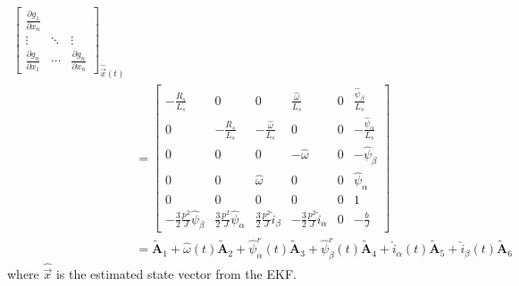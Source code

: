 \documentclass[12pt,a4paper,oneside]{book}
\begin{document}
\begin{onehalfspace}
\begin{mybox}
\begin{equation}
\begin{aligned}
\begin{bmatrix}
				\frac{\partial g_1}{\partial x_n} \\[6pt]
				\vdots & \ddots & \vdots \\[6pt]
				\frac{\partial g_n}{\partial x_1} & \cdots & \frac{\partial 
					g_n}{\partial x_n}
			\end{bmatrix}_{\hat{\vec{x}}(t)} \\[8pt]
			&= \begin{bmatrix} 
				-\frac{R_s}{L_s} & 0 & 0 & \frac{\hat{\omega}}{L_s} & 0 & \frac{\hat{\psi}_\beta}{L_s} \\[6pt]			
				0 & -\frac{R_s}{L_s} & -\frac{\hat{\omega}}{L_s} & 0 & 0 & -\frac{\hat{\psi}_\alpha}{L_s} \\[6pt]
				0 & 0 & 0 & -\hat{\omega} & 0 & -\hat{\psi}_\beta \\[6pt]
				0 & 0 & \hat{\omega} & 0 & 0 & \hat{\psi}_\alpha \\[6pt]
				0 & 0 & 0 & 0 & 0 & 1 \\[6pt]
				-\frac{3}{2}\frac{p^2}{J}\hat{\psi}_\beta & \frac{3}{2}\frac{p^2}{J}\hat{\psi}_\alpha
				& \frac{3}{2}\frac{p^2}{J}\hat{i}_\beta & -\frac{3}{2}\frac{p^2}{J}\hat{i}_\alpha & 0 & -\frac{b}{J}
			\end{bmatrix}  \\[8pt]
			&=\tilde{\mathbf{A}}_1 + 
			\hat{\omega}(t) \tilde{\mathbf{A}}_2 + \hat{\psi}_\alpha^r(t) 
			\tilde{\mathbf{A}}_3 + \hat{\psi}_\beta^r(t) \tilde{\mathbf{A}}_4
			+ \hat{i}_\alpha(t) 
			\tilde{\mathbf{A}}_5 + \hat{i}_\beta(t) \tilde{\mathbf{A}}_6
		\end{aligned}
	\end{equation} 
	where $\hat{\vec{x}}$ is the estimated state vector from the EKF.
\end{mybox}


\end{onehalfspace}
\end{document}
